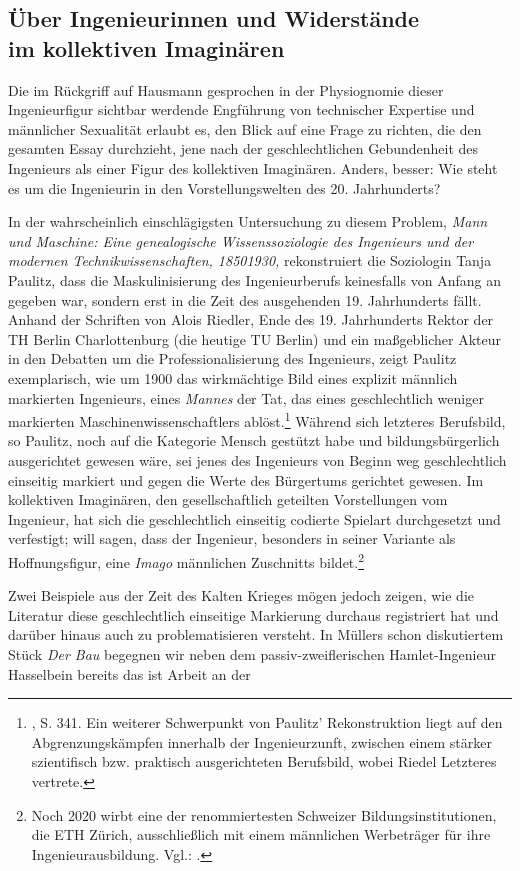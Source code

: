\documentclass[%
	fontsize=10pt,%
	twoside,%
	headings=optiontoheadandtoc,%
	showtrims]{scrbook}
\begin{document}
\subsection[Über Ingenieurinnen \textendash{} und Wider\-stände    im kollektiven Imaginären]{Über Ingenieurinnen \textendash{} und Wider\-stände \- \protect\\ im kollektiven Imaginären}
\par Die \textendash{} im Rückgriff auf Hausmann gesprochen \textendash{} in der Physiognomie dieser Ingenieurfigur sichtbar werdende Engführung von technischer Expertise und männlicher Sexualität erlaubt es, den Blick auf eine Frage zu richten, die den gesamten Essay durchzieht, jene nach der geschlechtlichen Gebundenheit des Ingenieurs als einer Figur des kollektiven Imaginären. Anders, besser: Wie steht es um die Ingenieurin in den Vorstellungswelten des 20. Jahrhunderts?\par In der wahrscheinlich einschlägigsten Untersuchung zu diesem Problem, \emph{Mann und Maschine: Eine genealogische Wissenssoziologie des Ingenieurs und der modernen Technikwissenschaften, 1850\textendash{}1930,} rekonstruiert die Soziologin Tanja Paulitz, dass die Maskulinisierung des Ingenieurberufs keinesfalls von Anfang an gegeben war, sondern erst in die Zeit des ausgehenden 19. Jahrhunderts fällt. Anhand der Schriften von Alois Riedler, Ende des 19. Jahrhunderts Rektor der TH Berlin Charlottenburg (die heutige TU Berlin) und ein maßgeblicher Akteur in den Debatten um die Professionalisierung des Ingenieurs, zeigt Paulitz exemplarisch, wie um 1900 das wirkmächtige Bild eines explizit männlich markierten Ingenieurs, eines \emph{Mannes} der Tat, das eines geschlechtlich weniger markierten Maschinenwissenschaftlers ablöst.\footnote{\cite[][]{paulitz2012a}, S. 341. Ein weiterer Schwerpunkt von Paulitz\textquoteright{} Rekonstruktion liegt auf den Abgrenzungskämpfen innerhalb der Ingenieurzunft, zwischen einem stärker szientifisch bzw. praktisch ausgerichteten Berufsbild, wobei Riedel Letzteres vertrete.}  Während sich letzteres Berufsbild, so Paulitz, noch auf die Kategorie Mensch gestützt habe und bildungsbürgerlich ausgerichtet gewesen wäre, sei jenes des Ingenieurs von Beginn weg geschlechtlich einseitig markiert und gegen die Werte des Bürgertums gerichtet gewesen. Im kollektiven Imaginären, den gesellschaftlich geteilten Vorstellungen vom Ingenieur, hat sich die geschlechtlich einseitig codierte Spielart durchgesetzt und verfestigt; will sagen, dass der Ingenieur, besonders in seiner Variante als Hoffnungsfigur, eine \emph{Imago} männlichen Zuschnitts bildet.\footnote{Noch 2020 wirbt eine der renommiertesten Schweizer Bildungsinstitutionen, die ETH Zürich, ausschließlich mit einem männlichen Werbeträger für ihre Ingenieurausbildung. Vgl.: \cite[][]{wuersten2020a}.} \par Zwei Beispiele aus der Zeit des Kalten Krieges mögen jedoch zeigen, wie die Literatur diese geschlechtlich einseitige Markierung durchaus registriert hat und darüber hinaus auch zu problematisieren versteht. In Müllers schon diskutiertem Stück \emph{Der Bau} begegnen wir neben dem passiv-zweiflerischen Hamlet-Ingenieur Hasselbein \textendash{} bereits das ist Arbeit an der 
\end{document}

